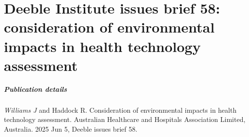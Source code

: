 \chapter{Deeble Institute issues brief 58: consideration of environmental impacts in health technology assessment}
\label{ap-i}

\paragraph*{Publication details}
\textit{Williams J} and Haddock R. Consideration of environmental impacts in health technology assessment. Australian Healthcare and Hospitals Association Limited, Australia. 2025 Jun 5, Deeble issues brief 58.

